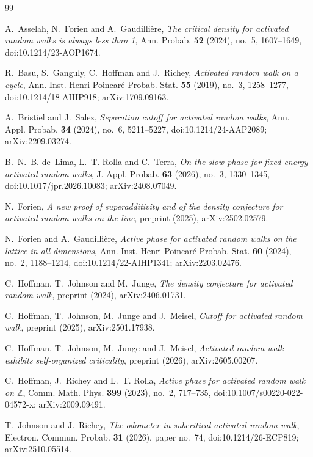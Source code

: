 \documentclass[11pt]{amsart}
\theoremstyle{remark}
\newcommand{\Z}{\mathbb Z}
\begin{document}
\begin{thebibliography}{99}\raggedright

A.~Asselah, N.~Forien and A.~Gaudilli\`ere,
\emph{The critical density for activated random walks is always less than 1},
Ann. Probab. \textbf{52} (2024), no.~5, 1607--1649, doi:10.1214/23-AOP1674.

R.~Basu, S.~Ganguly, C.~Hoffman and J.~Richey,
\emph{Activated random walk on a cycle},
Ann. Inst. Henri Poincar\'e Probab. Stat. \textbf{55} (2019), no.~3, 1258--1277, doi:10.1214/18-AIHP918;
arXiv:1709.09163.

A.~Bristiel and J.~Salez,
\emph{Separation cutoff for activated random walks},
Ann. Appl. Probab. \textbf{34} (2024), no.~6, 5211--5227, doi:10.1214/24-AAP2089; arXiv:2209.03274.

B.~N.~B. de~Lima, L.~T. Rolla and C.~Terra,
\emph{On the slow phase for fixed-energy activated random walks},
J. Appl. Probab. \textbf{63} (2026), no.~3, 1330--1345, doi:10.1017/jpr.2026.10083; arXiv:2408.07049.

N.~Forien,
\emph{A new proof of superadditivity and of the density conjecture for activated random walks on the line},
preprint (2025), arXiv:2502.02579.

N.~Forien and A.~Gaudilli\`ere,
\emph{Active phase for activated random walks on the lattice in all dimensions},
Ann. Inst. Henri Poincar\'e Probab. Stat. \textbf{60} (2024), no.~2, 1188--1214, doi:10.1214/22-AIHP1341;
arXiv:2203.02476.

C.~Hoffman, T.~Johnson and M.~Junge,
\emph{The density conjecture for activated random walk},
preprint (2024), arXiv:2406.01731.

C.~Hoffman, T.~Johnson, M.~Junge and J.~Meisel,
\emph{Cutoff for activated random walk},
preprint (2025), arXiv:2501.17938.

C.~Hoffman, T.~Johnson, M.~Junge and J.~Meisel,
\emph{Activated random walk exhibits self-organized criticality},
preprint (2026), arXiv:2605.00207.

C.~Hoffman, J.~Richey and L.~T. Rolla,
\emph{Active phase for activated random walk on $\Z$},
Comm. Math. Phys. \textbf{399} (2023), no.~2, 717--735, doi:10.1007/s00220-022-04572-x; arXiv:2009.09491.

T.~Johnson and J.~Richey,
\emph{The odometer in subcritical activated random walk},
Electron. Commun. Probab. \textbf{31} (2026), paper no.~74, doi:10.1214/26-ECP819; arXiv:2510.05514.


\end{thebibliography}
\end{document}
